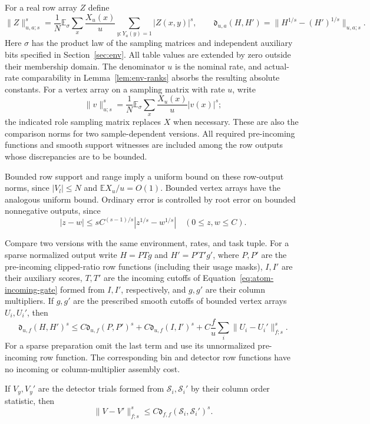 For a real row array $Z$ define
\begin{equation}
 \|Z\|_{u,a;s}^s=
 \frac1N\mathbb E_\sigma\sum_x\frac{X_u(x)}u
                 \sum_{y:Y_a(y)=1}|Z(x,y)|^s,
 \qquad
 \mathfrak d_{u,a}(H,H')=
   \|H^{1/s}-(H')^{1/s}\|_{u,a;s}.
 \label{eq:atom-row-norm}
\end{equation}
Here $\sigma$ has the product law of the sampling matrices and independent
auxiliary bits specified in Section~\ref{sec:env}.  All table values are
extended by zero outside their membership domain.  The denominator $u$
is the nominal rate, and actual-rate comparability in
Lemma~\ref{lem:env-ranks} absorbs the resulting absolute constants.
For a vertex array on a sampling matrix with rate $u$, write
\begin{equation}
 \|v\|_{u;s}^s=
    \frac1N\mathbb E_\sigma\sum_x\frac{X_u(x)}u|v(x)|^s;
 \label{eq:atom-vertex-norm}
\end{equation}
the indicated role sampling matrix replaces $X$ when necessary.  These are also
the comparison norms for two sample-dependent versions.  All required
pre-incoming functions and smooth support witnesses are included among
the row outputs whose discrepancies are to be bounded.

Bounded row support and range imply a uniform bound on these row-output
norms, since $|V_l|\le N$ and $\mathbb E X_u/u=O(1)$.  Bounded vertex
arrays have the analogous uniform bound.  Ordinary error is controlled
by root error on bounded nonnegative outputs, since
\begin{equation}
 |z-w|\le s C^{(s-1)/s}|z^{1/s}-w^{1/s}|
 \quad(0\le z,w\le C).
 \label{eq:atom-ordinary-from-root}
\end{equation}

\begin{lemma}
\label{lem:atom-assembly}
Compare two versions with the same environment, rates, and task tuple.
For a sparse normalized output write $H=P T g$ and
$H'=P'T'g'$, where $P,P'$ are the pre-incoming clipped-ratio row
functions (including their usage masks), $I,I'$ are their auxiliary
scores, $T,T'$ are the incoming cutoffs of
Equation~\eqref{eq:atom-incoming-gate} formed from $I,I'$, respectively,
and $g,g'$ are their column multipliers.  If $g,g'$ are the
prescribed smooth cutoffs of bounded vertex arrays $U_i,U_i'$, then
\begin{equation}
 \mathfrak d_{u,f}(H,H')^s
 \le C\mathfrak d_{u,f}(P,P')^s
    +C\mathfrak d_{u,f}(I,I')^s
    +C\frac fu\sum_i\|U_i-U_i'\|_{f;s}^s.
 \label{eq:atom-assembly-bound}
\end{equation}
For a sparse preparation omit the last term and use its unnormalized
pre-incoming row function.  The corresponding bin and detector row
functions have no incoming or column-multiplier assembly cost.

If $V_y,V_y'$ are the detector trials formed from
$\mathcal S_i,\mathcal S_i'$ by their column order statistic, then
\begin{equation}
 \|V-V'\|_{f;s}^s
   \le C\mathfrak d_{f,f}(\mathcal S_i,\mathcal S_i')^s.
 \label{eq:atom-detector-comparison}
\end{equation}
\end{lemma}

